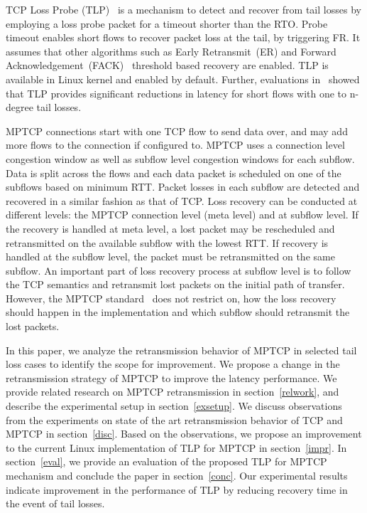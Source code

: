 \documentclass[10pt,conference,compsoc]{IEEEtran}
\begin{document}
TCP Loss Probe (TLP)~\cite{Flach:2013} is a mechanism to detect and recover from tail losses by employing a loss probe packet for a timeout shorter than the RTO. Probe timeout enables short flows to recover packet loss at the tail, by triggering FR. It assumes that other algorithms such as Early Retransmit~(ER)\cite{rfc5827} and Forward Acknowledgement~(FACK)~\cite{FACK} threshold based recovery are enabled. TLP is available in Linux kernel and enabled by default. Further, evaluations in~\cite{Rajiullah:2015} showed that TLP provides significant reductions in latency for short flows with one to n-degree tail losses. 

 MPTCP connections start with one TCP flow to send data over, and may add more flows to the connection if configured to. MPTCP uses a connection level congestion window as well as subflow level congestion windows for each subflow. Data is split across the flows and each data packet is scheduled on one of the subflows based on minimum RTT. Packet losses in each subflow are detected and recovered in a similar fashion as that of TCP. Loss recovery can be conducted at different levels: the MPTCP connection level (meta level) and at subflow level. If the recovery is handled at meta level, a lost packet may be rescheduled and retransmitted on the available subflow with the lowest RTT. If recovery is handled at the subflow level, the packet must be retransmitted on the same subflow. An important part of loss recovery process at subflow level is to follow the TCP semantics and retransmit lost packets on the initial path of transfer. However, the MPTCP standard~\cite{rfc6824} does not restrict on, how the loss recovery should happen in the implementation and which subflow should retransmit the lost packets.


In this paper, we analyze the retransmission behavior of MPTCP in selected tail loss cases to identify the scope for improvement. We propose a change in the retransmission strategy of MPTCP to improve the latency performance. We provide related research on MPTCP retransmission in section~\ref{relwork}, and describe the experimental setup in section~\ref{exsetup}. We discuss observations from the experiments on state of the art retransmission behavior of TCP and MPTCP in section~\ref{disc}. Based on the observations, we propose an improvement to the current Linux implementation of TLP for MPTCP in section~\ref{impr}. In section~\ref{eval}, we provide an evaluation of the proposed TLP for MPTCP mechanism and conclude the paper in section~\ref{conc}. Our experimental results indicate improvement in the performance of TLP by reducing recovery time in the event of tail losses.
 
\end{document}
